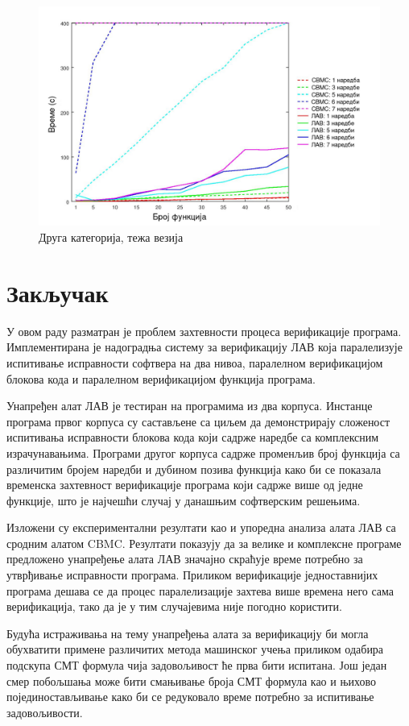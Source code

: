 \documentclass[12pt,oneside]{memoir}
\begin{document}
\begin{figure}[!ht]
  \centering
  \includegraphics[scale=0.6]{img/nivo_2Ta.jpg}
  \caption{Друга категорија, тежа везија}
  \label{fig:nivo_2t}
\end{figure}


\chapter{Закључак} 

У овом раду разматран је проблем захтевности процеса верификације програма. Имплементирана је надоградња систему за верификацију ЛАВ која паралелизује испитивање исправности софтвера на два нивоа, паралелном верификацијом блокова кода и паралелном верификацијом функција програма.

Унапређен алат ЛАВ је тестиран на програмима из два корпуса. Инстанце програма првог корпуса су састављене са циљем да демонстрирају сложеност испитивања исправности блокова кода који садрже наредбе са комплексним израчунавањима. Програми другог корпуса садрже променљив број функција са различитим бројем наредби и дубином позива функција како би се показала временска захтевност верификације програма који садрже више од једне функције, што је најчешћи случај у данашњим софтверским решењима.

Изложени су експериментални резултати као и упоредна анализа алата ЛАВ са сродним алатом CBMC. Резултати показују да за велике и комплексне програме предложено унапређење алата ЛАВ значајно скраћује време потребно за утврђивање исправности програма. Приликом верификације једноставнијих програма дешава се да процес паралелизације захтева више времена него сама верификација, тако да је у тим случајевима није погодно користити.

Будућа истраживања на тему унапређења алата за верификацију би могла обухватити примене различитих метода машинског учења приликом одабира подскупа СМТ формула чија задовољивост ће прва бити испитана. Још један смер побољшања може бити смањивање броја СМТ формула као и њихово појединостављивање како би се редуковало време потребно за испитивање задовољивости.


\literatura
\backmatter
\end{document}
